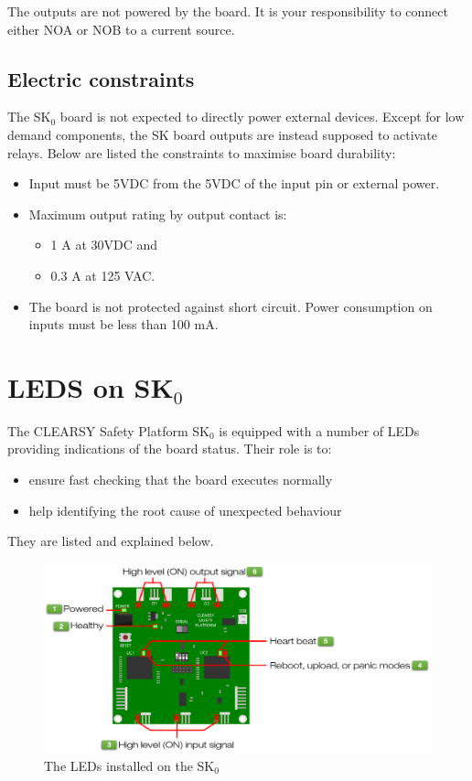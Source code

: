 The outputs are not powered by the board. It is your responsibility to connect either NOA or NOB to a current source.

\section{Electric constraints}

The SK$_0$ board is not expected to directly power external devices. Except for low demand components, the SK board outputs are instead supposed to activate relays. Below are listed the constraints to maximise board durability:  
\begin{itemize}
    \item Input must be 5VDC from the 5VDC of the input pin or external power.
    \item Maximum output rating by output contact is:
    \begin{itemize}
        \item 1 A at 30VDC and
        \item  0.3 A at 125 VAC.
    \end{itemize}
    \item The board is not protected against short circuit. Power consumption on inputs must be less than 100 mA.
\end{itemize}


\chapter{LEDS on SK$_0$}


The CLEARSY Safety Platform SK$_0$ is equipped with a number of LEDs providing indications of the board status. Their role is to:
\begin{itemize}
    \item ensure fast checking that the board executes normally
    \item help identifying the root cause of unexpected behaviour
\end{itemize}
 They are listed and explained below.

\begin{figure}[h]
\centering\includegraphics[scale=0.28]{Pictures/chapterAnnexes/SK0-lights.png}
\caption{The LEDs installed on the SK$_0$}
\label{annexes:SK0-HW-light}
\end{figure}

